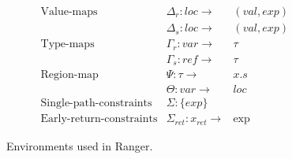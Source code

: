\begin{figure}
$$
\begin{array}{lllll}
\text{Value-maps} & \Delta_r: loc \rightarrow & ( val, exp) &&
\\
& \Delta_s: loc \rightarrow & ( val, exp) &&
\\
\text{Type-maps}  & \Gamma_r: var \rightarrow & \tau & &
\\
& \Gamma_s: ref \rightarrow & \tau&&
\\
\text{Region-map} & \Psi: \tau \rightarrow & x.s &&
\\
& \Theta: var \rightarrow & loc &&
\\
\text{Single-path-constraints} & \Sigma: \{exp\} &  &  & 
\\
\text{Early-return-constraints} & \Sigma_{ret}: x_{ret} \rightarrow & \exp &  & 
\end{array}
$$
\caption{Environments used in Ranger.}
\label{fig:environment}
\end{figure}

%
